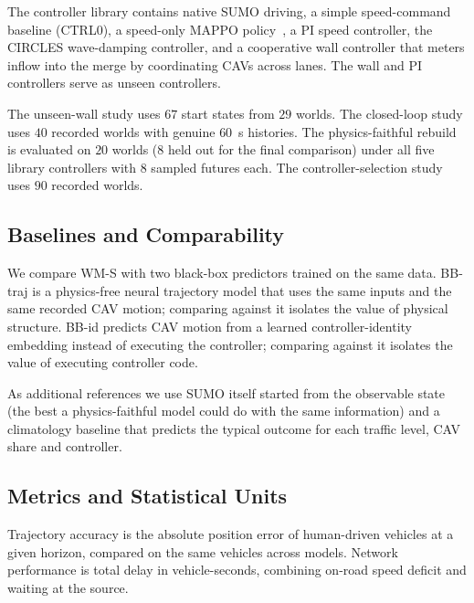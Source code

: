 \documentclass[conference]{IEEEtran}
\begin{document}
The controller library contains native SUMO driving, a simple speed-command baseline (CTRL0), a speed-only MAPPO policy~\cite{yu_mappo}, a PI speed controller, the CIRCLES wave-damping controller, and a cooperative wall controller that meters inflow into the merge by coordinating CAVs across lanes. The wall and PI controllers serve as unseen controllers.

The unseen-wall study uses $67$ start states from $29$ worlds. %
The closed-loop study uses $40$ recorded worlds with genuine $60$~s histories. %
The physics-faithful rebuild is evaluated on $20$ worlds ($8$ held out for the final comparison) under all five library controllers with $8$ sampled futures each. %
The controller-selection study uses $90$ recorded worlds. %

\subsection{Baselines and Comparability}
We compare WM-S with two black-box predictors trained on the same data. BB-traj is a physics-free neural trajectory model that uses the same inputs and the same recorded CAV motion; comparing against it isolates the value of physical structure. BB-id predicts CAV motion from a learned controller-identity embedding instead of executing the controller; comparing against it isolates the value of executing controller code.

As additional references we use SUMO itself started from the observable state (the best a physics-faithful model could do with the same information) and a climatology baseline that predicts the typical outcome for each traffic level, CAV share and controller.

\subsection{Metrics and Statistical Units}
Trajectory accuracy is the absolute position error of human-driven vehicles at a given horizon, compared on the same vehicles across models. Network performance is total delay in vehicle-seconds, combining on-road speed deficit and waiting at the source.
\end{document}
